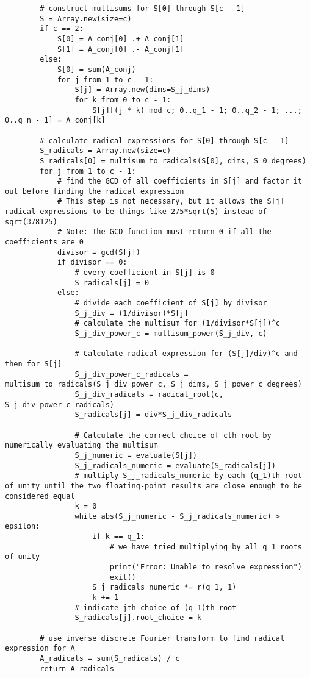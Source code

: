 \documentclass{article}
\begin{document}
\begin{lstlisting}
        # construct multisums for S[0] through S[c - 1]
        S = Array.new(size=c)
        if c == 2:
            S[0] = A_conj[0] .+ A_conj[1]
            S[1] = A_conj[0] .- A_conj[1]
        else:
            S[0] = sum(A_conj)
            for j from 1 to c - 1:
                S[j] = Array.new(dims=S_j_dims)
                for k from 0 to c - 1:
                    S[j][(j * k) mod c; 0..q_1 - 1; 0..q_2 - 1; ...; 0..q_n - 1] = A_conj[k]

        # calculate radical expressions for S[0] through S[c - 1]
        S_radicals = Array.new(size=c)
        S_radicals[0] = multisum_to_radicals(S[0], dims, S_0_degrees)
        for j from 1 to c - 1:
            # find the GCD of all coefficients in S[j] and factor it out before finding the radical expression
            # This step is not necessary, but it allows the S[j] radical expressions to be things like 275*sqrt(5) instead of sqrt(378125)
            # Note: The GCD function must return 0 if all the coefficients are 0
            divisor = gcd(S[j])
            if divisor == 0:
                # every coefficient in S[j] is 0
                S_radicals[j] = 0
            else:
                # divide each coefficient of S[j] by divisor
                S_j_div = (1/divisor)*S[j]
                # calculate the multisum for (1/divisor*S[j])^c
                S_j_div_power_c = multisum_power(S_j_div, c)

                # Calculate radical expression for (S[j]/div)^c and then for S[j]
                S_j_div_power_c_radicals = multisum_to_radicals(S_j_div_power_c, S_j_dims, S_j_power_c_degrees)
                S_j_div_radicals = radical_root(c, S_j_div_power_c_radicals)
                S_radicals[j] = div*S_j_div_radicals

                # Calculate the correct choice of cth root by numerically evaluating the multisum
                S_j_numeric = evaluate(S[j])
                S_j_radicals_numeric = evaluate(S_radicals[j])
                # multiply S_j_radicals_numeric by each (q_1)th root of unity until the two floating-point results are close enough to be considered equal
                k = 0
                while abs(S_j_numeric - S_j_radicals_numeric) > epsilon:
                    if k == q_1:
                        # we have tried multiplying by all q_1 roots of unity
                        print("Error: Unable to resolve expression")
                        exit()
                    S_j_radicals_numeric *= r(q_1, 1)
                    k += 1
                # indicate jth choice of (q_1)th root
                S_radicals[j].root_choice = k

        # use inverse discrete Fourier transform to find radical expression for A
        A_radicals = sum(S_radicals) / c
        return A_radicals
    \end{lstlisting}
\end{document}
